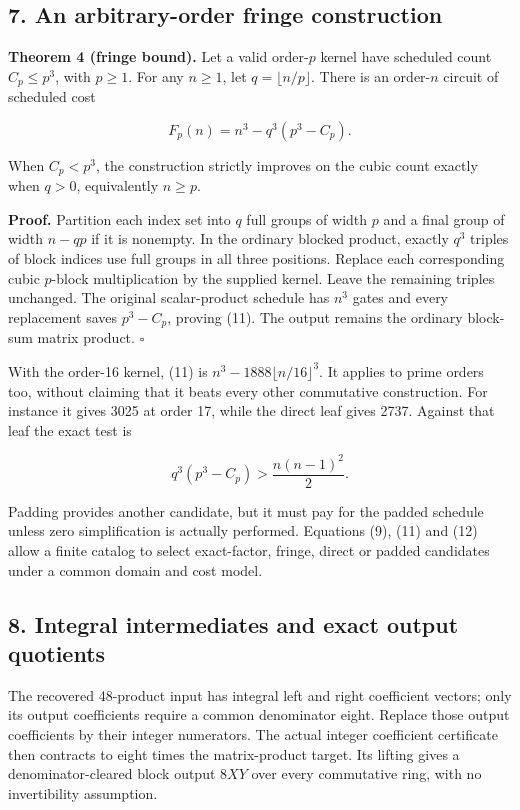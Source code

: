 \documentclass[
  11pt,
]{article}
\newcounter{none} %
\begin{document}
\subsection{7. An arbitrary-order fringe
construction}\label{an-arbitrary-order-fringe-construction}

\textbf{Theorem 4 (fringe bound).} Let a valid order-\(p\) kernel have
scheduled count \(C_p\le p^3\), with \(p\ge1\). For any \(n\ge1\), let
\(q=\lfloor n/p\rfloor\). There is an order-\(n\) circuit of scheduled
cost

\[
F_p(n)=n^3-q^3(p^3-C_p).
\tag{11}
\]

When \(C_p<p^3\), the construction strictly improves on the cubic count
exactly when \(q>0\), equivalently \(n\ge p\).

\textbf{Proof.} Partition each index set into \(q\) full groups of width
\(p\) and a final group of width \(n-qp\) if it is nonempty. In the
ordinary blocked product, exactly \(q^3\) triples of block indices use
full groups in all three positions. Replace each corresponding cubic
\(p\)-block multiplication by the supplied kernel. Leave the remaining
triples unchanged. The original scalar-product schedule has \(n^3\)
gates and every replacement saves \(p^3-C_p\), proving (11). The output
remains the ordinary block-sum matrix product. \(\square\)

With the order-16 kernel, (11) is \(n^3-1888\lfloor n/16\rfloor^3\). It
applies to prime orders too, without claiming that it beats every other
commutative construction. For instance it gives 3025 at order 17, while
the direct leaf gives 2737. Against that leaf the exact test is

\[
q^3(p^3-C_p)>\frac{n(n-1)^2}{2}.
\tag{12}
\]

Padding provides another candidate, but it must pay for the padded
schedule unless zero simplification is actually performed. Equations
(9), (11) and (12) allow a finite catalog to select exact-factor,
fringe, direct or padded candidates under a common domain and cost
model.

\subsection{8. Integral intermediates and exact output
quotients}\label{integral-intermediates-and-exact-output-quotients}

The recovered 48-product input has integral left and right coefficient
vectors; only its output coefficients require a common denominator
eight. Replace those output coefficients by their integer numerators.
The actual integer coefficient certificate then contracts to eight times
the matrix-product target. Its lifting gives a denominator-cleared block
output \(8XY\) over every commutative ring, with no invertibility
assumption.
\end{document}
